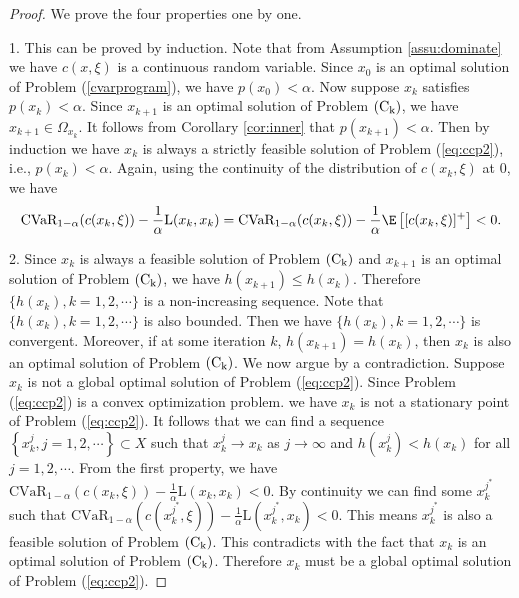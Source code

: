 \begin{proof} We prove the four properties one by one.

1. This can be proved by induction. Note that from Assumption
\ref{assu:dominate} we have $c(x,\xi)$ is a continuous random
variable. Since $x_0$ is an optimal solution of Problem
(\ref{cvarprogram}), we have $p(x_0)<\alpha$. Now suppose $x_k$
satisfies $p(x_k)<\alpha$. Since $x_{k+1}$ is an optimal solution of
Problem \mbox{$ ({\rm C_k})$}, we have $x_{k+1}\in \Omega_{x_k}$. It
follows from Corollary \ref{cor:inner} that $p(x_{k+1})<\alpha$.
Then by induction we have $x_k$ is always a strictly feasible
solution of Problem (\ref{eq:ccp2}), i.e., $p(x_k)<\alpha$. Again,
using the continuity of the distribution of $c(x_k,\xi)$ at $0$, we
have
\[\mbox{CVaR}_{1-\alpha}(c(x_k,\xi))-\frac{1}{\alpha}\mbox{L}(x_k,x_k)=
\mbox{CVaR}_{1-\alpha}(c(x_k,\xi))-\frac{1}{\alpha}
\E\left[[c(x_k,\xi)]^+\right]<0.\]

2. Since $x_k$ is always a feasible solution of Problem \mbox{$
({\rm C_k})$} and $x_{k+1}$ is an optimal solution of Problem
\mbox{$ ({\rm C_k})$}, we have $h(x_{k+1})\le h(x_k)$. Therefore
$\{h(x_k),k=1,2,\cdots\}$ is a non-increasing sequence. Note that
$\{h(x_k),k=1,2,\cdots\}$ is also bounded. Then we have
$\{h(x_k),k=1,2,\cdots\}$ is convergent. Moreover, if at some
iteration $k$, $h(x_{k+1})= h(x_k)$, then $x_k$ is also an optimal
solution of Problem \mbox{$ ({\rm C_k})$}. We now argue by a
contradiction. Suppose $x_k$ is not a global optimal solution of
Problem (\ref{eq:ccp2}). Since Problem (\ref{eq:ccp2}) is a convex
optimization problem. we have $x_k$ is not a stationary point of
Problem (\ref{eq:ccp2}). It follows that we can find a sequence
$\left\{x_k^j, j=1,2,\cdots\right\}\subset X$ such that $x_k^j\to
x_k$ as $j\to \infty$ and $h(x_k^j)<h(x_k)$ for all $j=1,2,\cdots$.
From the first property, we have
$\mbox{CVaR}_{1-\alpha}(c(x_k,\xi))-\frac{1}{\alpha}\mbox{L}(x_k,x_k)<0$.
By continuity we can find some $x_k^{j^*}$ such that
$\mbox{CVaR}_{1-\alpha}(c(x_k^{j^*},\xi))-
\frac{1}{\alpha}\mbox{L}(x_k^{j^*},x_k)<0$. This means $x_k^{j^*}$
is also a feasible solution of Problem \mbox{$ ({\rm C_k})$}. This
contradicts with the fact that $x_k$ is an optimal solution of
Problem \mbox{$ ({\rm C_k})$}. Therefore $x_k$ must be a global
optimal solution of Problem (\ref{eq:ccp2}).
\end{proof}
